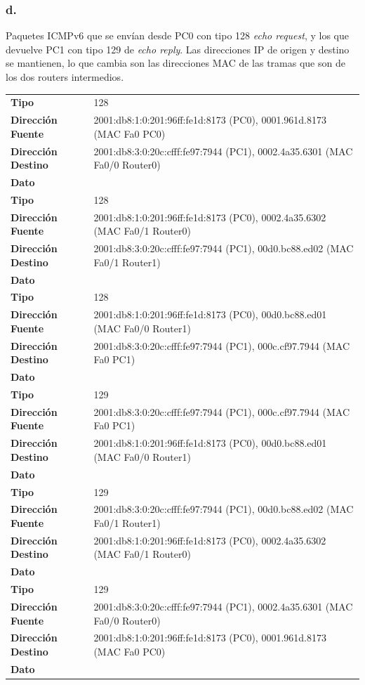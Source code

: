 \documentclass[11pt]{article}
\begin{document}
\subsubsection*{d.}
\label{sec:orgd1ef21c}
Paquetes ICMPv6 que se envían desde PC0 con tipo 128 \emph{echo request}, y los que devuelve PC1 con tipo 129 de \emph{echo reply}. Las direcciones IP de origen y destino se mantienen, lo que cambia son las direcciones MAC de las tramas que son de los dos routers intermedios.
\begin{center}
\begin{tabular}{ll}
\hline
\textbf{Tipo} & 128\\
\textbf{Dirección Fuente} & 2001:db8:1:0:201:96ff:fe1d:8173 (PC0), 0001.961d.8173 (MAC Fa0 PC0)\\
\textbf{Dirección Destino} & 2001:db8:3:0:20c:cfff:fe97:7944 (PC1), 0002.4a35.6301 (MAC Fa0/0 Router0)\\
\textbf{Dato} & \\
\hline
\textbf{Tipo} & 128\\
\textbf{Dirección Fuente} & 2001:db8:1:0:201:96ff:fe1d:8173 (PC0), 0002.4a35.6302 (MAC Fa0/1 Router0)\\
\textbf{Dirección Destino} & 2001:db8:3:0:20c:cfff:fe97:7944 (PC1), 00d0.bc88.ed02 (MAC Fa0/1 Router1)\\
\textbf{Dato} & \\
\hline
\textbf{Tipo} & 128\\
\textbf{Dirección Fuente} & 2001:db8:1:0:201:96ff:fe1d:8173 (PC0), 00d0.bc88.ed01 (MAC Fa0/0 Router1)\\
\textbf{Dirección Destino} & 2001:db8:3:0:20c:cfff:fe97:7944 (PC1), 000c.cf97.7944 (MAC Fa0 PC1)\\
\textbf{Dato} & \\
\hline
\textbf{Tipo} & 129\\
\textbf{Dirección Fuente} & 2001:db8:3:0:20c:cfff:fe97:7944 (PC1), 000c.cf97.7944 (MAC Fa0 PC1)\\
\textbf{Dirección Destino} & 2001:db8:1:0:201:96ff:fe1d:8173 (PC0), 00d0.bc88.ed01 (MAC Fa0/0 Router1)\\
\textbf{Dato} & \\
\hline
\textbf{Tipo} & 129\\
\textbf{Dirección Fuente} & 2001:db8:3:0:20c:cfff:fe97:7944 (PC1), 00d0.bc88.ed02 (MAC Fa0/1 Router1)\\
\textbf{Dirección Destino} & 2001:db8:1:0:201:96ff:fe1d:8173 (PC0), 0002.4a35.6302 (MAC Fa0/1 Router0)\\
\textbf{Dato} & \\
\hline
\textbf{Tipo} & 129\\
\textbf{Dirección Fuente} & 2001:db8:3:0:20c:cfff:fe97:7944 (PC1), 0002.4a35.6301 (MAC Fa0/0 Router0)\\
\textbf{Dirección Destino} & 2001:db8:1:0:201:96ff:fe1d:8173 (PC0), 0001.961d.8173 (MAC Fa0 PC0)\\
\textbf{Dato} & \\
\hline
\end{tabular}
\end{center}
\newpage
\end{document}
